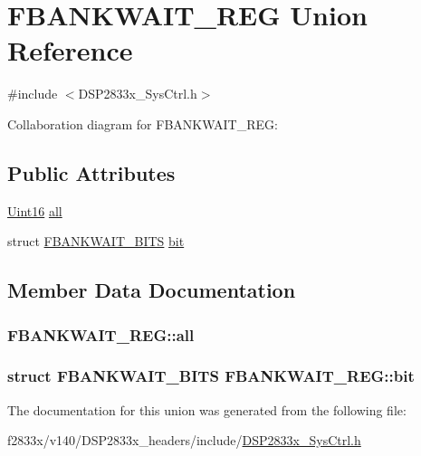 \hypertarget{union_f_b_a_n_k_w_a_i_t___r_e_g}{}\section{F\+B\+A\+N\+K\+W\+A\+I\+T\+\_\+\+R\+E\+G Union Reference}
\label{union_f_b_a_n_k_w_a_i_t___r_e_g}


{\ttfamily \#include $<$D\+S\+P2833x\+\_\+\+Sys\+Ctrl.\+h$>$}



Collaboration diagram for F\+B\+A\+N\+K\+W\+A\+I\+T\+\_\+\+R\+E\+G\+:
\subsection*{Public Attributes}
\begin{DoxyCompactItemize}
\item 
\hyperlink{_d_s_p2833x___device_8h_a59a9f6be4562c327cbfb4f7e8e18f08b}{Uint16} \hyperlink{union_f_b_a_n_k_w_a_i_t___r_e_g_aedae156c4b8204ccec122c8ea5e8ead0}{all}
\item 
struct \hyperlink{struct_f_b_a_n_k_w_a_i_t___b_i_t_s}{F\+B\+A\+N\+K\+W\+A\+I\+T\+\_\+\+B\+I\+T\+S} \hyperlink{union_f_b_a_n_k_w_a_i_t___r_e_g_a94cadf33b8d56788736dbd7da4f32dc8}{bit}
\end{DoxyCompactItemize}


\subsection{Member Data Documentation}
\hypertarget{union_f_b_a_n_k_w_a_i_t___r_e_g_aedae156c4b8204ccec122c8ea5e8ead0}{}
\subsubsection[{all}]{ F\+B\+A\+N\+K\+W\+A\+I\+T\+\_\+\+R\+E\+G\+::all}\label{union_f_b_a_n_k_w_a_i_t___r_e_g_aedae156c4b8204ccec122c8ea5e8ead0}
\hypertarget{union_f_b_a_n_k_w_a_i_t___r_e_g_a94cadf33b8d56788736dbd7da4f32dc8}{}
\subsubsection[{bit}]{\setlength{\rightskip}{0pt plus 5cm}struct {\bf F\+B\+A\+N\+K\+W\+A\+I\+T\+\_\+\+B\+I\+T\+S} F\+B\+A\+N\+K\+W\+A\+I\+T\+\_\+\+R\+E\+G\+::bit}\label{union_f_b_a_n_k_w_a_i_t___r_e_g_a94cadf33b8d56788736dbd7da4f32dc8}


The documentation for this union was generated from the following file\+:\begin{DoxyCompactItemize}
\item 
f2833x/v140/\+D\+S\+P2833x\+\_\+headers/include/\hyperlink{_d_s_p2833x___sys_ctrl_8h}{D\+S\+P2833x\+\_\+\+Sys\+Ctrl.\+h}\end{DoxyCompactItemize}
